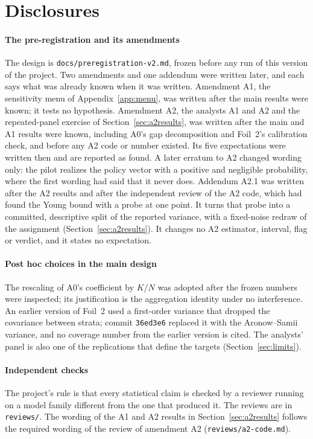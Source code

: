 \section{Disclosures}\label{app:disclosures}

\paragraph{The pre-registration and its amendments} The design is
\texttt{docs/preregistration-v2.md}, frozen before any run of this version of the
project. Two amendments and one addendum were written later, and each says what
was already known when it was written. Amendment A1, the sensitivity menu of
Appendix~\ref{app:menu}, was written after the main results were known; it tests
no hypothesis. Amendment A2, the analysts A1 and A2 and the repeated-panel exercise
of Section~\ref{sec:a2results}, was written after the main and A1 results were
known, including A0's gap decomposition and Foil~2's calibration check, and before
any A2 code or number existed. Its five expectations were written then and are
reported as found. A later erratum to A2 changed wording only: the pilot realizes
the policy vector with a positive and negligible probability, where the first
wording had said that it never does. Addendum A2.1 was written after the A2
results and after the independent review of the A2 code, which had found the Young
bound with a probe at one point. It turns that probe into a committed, descriptive
split of the reported variance, with a fixed-noise redraw of the assignment
(Section~\ref{sec:a2results}). It changes no A2 estimator, interval, flag or
verdict, and it states no expectation.

\paragraph{Post hoc choices in the main design} The rescaling of A0's coefficient
by $K/N$ was adopted after the frozen numbers were inspected; its justification is
the aggregation identity under no interference. An earlier version of Foil~2 used a
first-order variance that dropped the covariance between strata; commit
\texttt{36ed3e6} replaced it with the Aronow--Samii variance, and no coverage
number from the earlier version is cited. The analysts' panel is also one of the
replications that define the targets (Section~\ref{sec:limits}).

\paragraph{Independent checks} The project's rule is that every statistical claim
is checked by a reviewer running on a model family different from the one that
produced it. The reviews are in \texttt{reviews/}. The wording of the A1 and A2 results in
Section~\ref{sec:a2results} follows the required wording of the review of
amendment A2 (\texttt{reviews/a2-code.md}).

